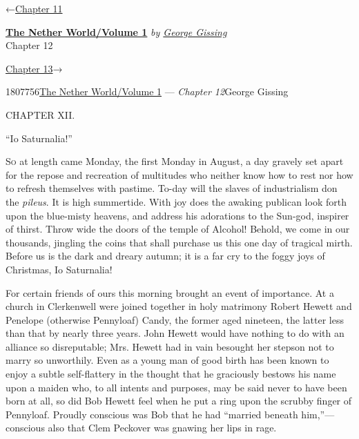 \hypertarget{headerContainer}{}
\hypertarget{navigationHeader}{}
\protect\hypertarget{headerprevious}{}{←\href{/wiki/The_Nether_World/Volume_1/Chapter_11}{Chapter
11}}

\textbf{\protect\hypertarget{header_title_text}{}{\href{/w/index.php?title=The_Nether_World/Volume_1\&action=edit\&redlink=1}{The
Nether World/Volume 1}}} \emph{by
\href{/wiki/Author:George_Gissing}{\protect\hypertarget{header_author_text}{}{{George
Gissing}}}}\\
\protect\hypertarget{header_section_text}{}{Chapter 12}

\protect\hypertarget{headernext}{}{\href{/wiki/The_Nether_World/Volume_1/Chapter_13}{Chapter
13}→}

\hypertarget{navigationNotes}{}

\hypertarget{ws-data}{}
\protect\hypertarget{ws-article-id}{}{1807756}\protect\hypertarget{ws-title}{}{\href{/w/index.php?title=The_Nether_World/Volume_1\&action=edit\&redlink=1}{The
Nether World/Volume 1} --- \emph{Chapter
12}}\protect\hypertarget{ws-author}{}{George Gissing}

{\protect\hypertarget{252}{}{}}

{CHAPTER XII.}

``Io Saturnalia!''

\textsc{So} at length came Monday, the first Monday in August, a day
gravely set apart for the repose and recreation of multitudes who
neither know how to rest nor how to refresh themselves with pastime.
To-day will the slaves of industrialism don the \emph{pileus}. It is
high summertide. With joy does the awaking publican look forth upon the
blue-misty heavens, and address his adorations to the Sun-god, inspirer
of thirst. Throw wide the doors of the temple of Alcohol! Behold, we
come in our thousands, jingling the coins that shall purchase us this
one day of tragical mirth. Before us is the dark and dreary autumn; it
is a far cry to the foggy joys of Christmas, Io Saturnalia!

For certain friends of ours this morning
{\protect\hypertarget{253}{}{}}brought an event of importance. At a
church in Clerkenwell were joined together in holy matrimony Robert
Hewett and Penelope (otherwise Pennyloaf) Candy, the former aged
nineteen, the latter less than that by nearly three years. John Hewett
would have nothing to do with an alliance so disreputable; Mrs. Hewett
had in vain besought her stepson not to marry so unworthily. Even as a
young man of good birth has been known to enjoy a subtle self-flattery
in the thought that he graciously bestows his name upon a maiden who, to
all intents and purposes, may be said never to have been born at all, so
did Bob Hewett feel when he put a ring upon the scrubby finger of
Pennyloaf. Proudly conscious was Bob that he had ``married beneath
him,''---conscious also that Clem Peckover was gnawing her lips in rage.

